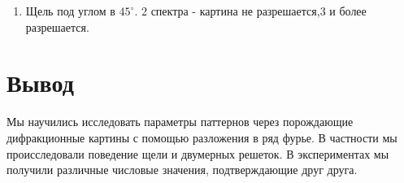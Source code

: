 \documentclass[a4paper, 12pt]{article}%
\begin{document}
\begin{enumerate}
\item Щель под углом в $45^{\circ}$. 2 спектра - картина не разрешается,3 и более разрешается.

\end{enumerate}

\section*{Вывод}

Мы научились исследовать параметры паттернов через порождающие дифракционные
картины с помощью разложения в ряд фурье. В частности мы происследовали поведение
щели и двумерных решеток. В экспериментах мы получили различные числовые значения, подтверждающие друг друга.
\end{document}
